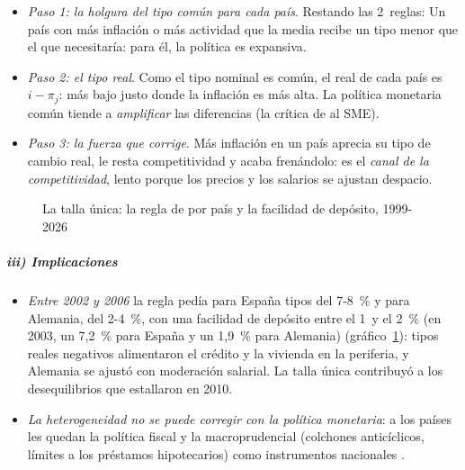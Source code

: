 \documentclass[11pt]{article}
\begin{document}
\begin{itemize}
\item \emph{Paso 1: la holgura del tipo común para cada país}. Restando las 2~reglas:
  Un país con más inflación o más actividad que la media recibe un tipo menor que el que necesitaría: para él, la política es expansiva.
\item \emph{Paso 2: el tipo real}. Como el tipo nominal es común, el real de cada país es $i-\pi_j$: más bajo justo donde la inflación es más alta. La política monetaria común tiende a \emph{amplificar} las diferencias (la crítica de  al SME).
\item \emph{Paso 3: la fuerza que corrige}. Más inflación en un país aprecia su tipo de cambio real, le resta competitividad y acaba frenándolo: es el \emph{canal de la competitividad}, lento porque los precios y los salarios se ajustan despacio.
\end{itemize}

\begin{figure}[H]
\centering
\caption{La talla única: la regla de  por país y la facilidad de depósito, 1999-2026}\label{fig:taylor-paises}
\end{figure}

\subparagraph{iii) Implicaciones}

\begin{itemize}
\item \emph{Entre 2002 y 2006} la regla pedía para España tipos del 7-8~\% y para Alemania, del 2-4~\%, con una facilidad de depósito entre el 1~y el 2~\% (en 2003, un 7,2~\% para España y un 1,9~\% para Alemania) (gráfico~\ref{fig:taylor-paises}): tipos reales negativos alimentaron el crédito y la vivienda en la periferia, y Alemania se ajustó con moderación salarial. La talla única contribuyó a los desequilibrios que estallaron en 2010.
\item \emph{La heterogeneidad no se puede corregir con la política monetaria}: a los países les quedan la política fiscal y la macroprudencial (colchones anticíclicos, límites a los préstamos hipotecarios) como instrumentos nacionales  .
\end{itemize}
\end{document}
